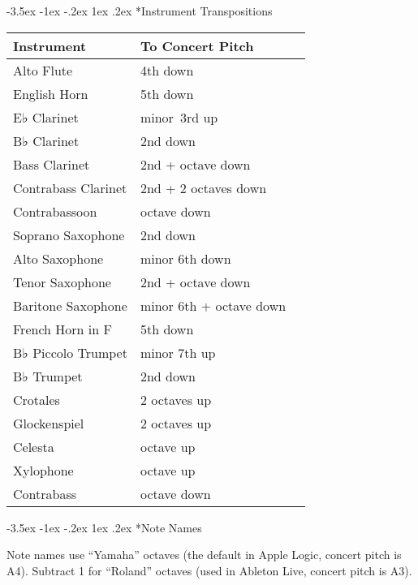 \documentclass{article}
\makeatletter
\renewcommand\section{\@startsection {section}{1}{\z@}%
                                     {-3.5ex \@plus -1ex \@minus -.2ex}%
                                     {1ex \@plus .2ex}%
                                     {\normalfont\normalsize}}%
\makeatother
\begin{document}
\begin{multicols*}{3}
  \scriptsize

  \section*{Instrument Transpositions}

  \begin{tabular}{@{}lll@{}} \toprule
    Instrument & To Concert Pitch \\ \midrule
    Alto Flute & 4th down \\
    English Horn & 5th down \\
    E♭ Clarinet & minor~3rd up \\
    B♭ Clarinet & 2nd down \\
    Bass Clarinet & 2nd + octave down \\
    Contrabass Clarinet & 2nd + 2 octaves down \\
    Contrabassoon &  octave down \\ \midrule
    Soprano Saxophone & 2nd down \\
    Alto Saxophone & minor 6th down \\
    Tenor Saxophone & 2nd + octave down \\
    Baritone Saxophone & minor 6th + octave down \\ \midrule
    French Horn in F & 5th down \\
    B♭ Piccolo Trumpet & minor 7th up \\
    B♭ Trumpet & 2nd down \\ \midrule
    Crotales & 2 octaves up \\
    Glockenspiel & 2 octaves up \\
    Celesta & octave up \\
    Xylophone & octave up \\ \midrule
    Contrabass & octave down \\ \bottomrule
  \end{tabular}


  \section*{Note Names}

  Note names use “Yamaha” octaves (the default in Apple Logic, concert pitch is {A4}).
  Subtract 1 for “Roland” octaves (used in Ableton Live, concert pitch is {A3}).


\end{multicols*}
\end{document}
